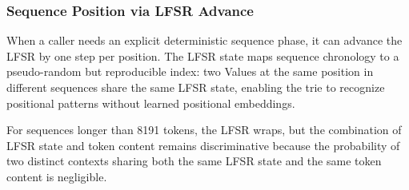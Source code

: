 \subsubsection{Sequence Position via LFSR Advance}

When a caller needs an explicit deterministic sequence phase, it can
advance the LFSR by one step per position.  The LFSR state maps sequence
chronology to a pseudo-random but reproducible index: two Values at the
same position in different sequences share the same LFSR state, enabling
the trie to recognize positional patterns without learned positional
embeddings.

For sequences longer than 8191 tokens, the LFSR wraps, but the
combination of LFSR state and token content remains discriminative
because the probability of two distinct contexts sharing both the
same LFSR state and the same token content is negligible.
